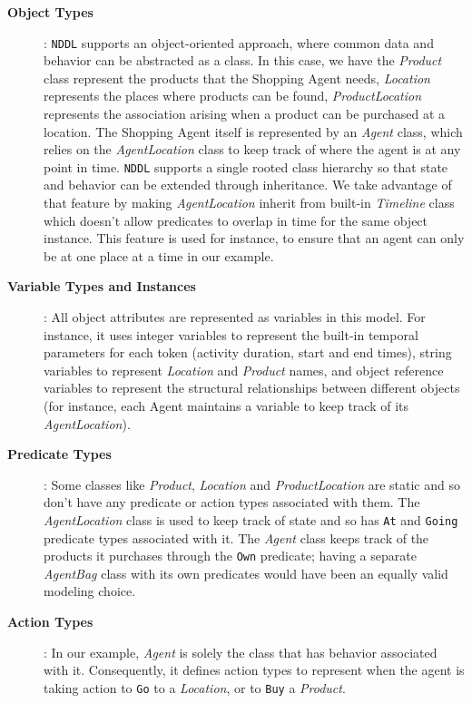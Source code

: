 \begin{description}

\item[\textbf{Object Types}]: \texttt{NDDL} supports an object-oriented
  approach, where common data and behavior can be abstracted as a
  class. In this case, we have the \textit{Product} class represent
  the products that the Shopping Agent needs, \textit{Location}
  represents the places where products can be found,
  \textit{ProductLocation} represents the association arising when a
  product can be purchased at a location. The Shopping Agent itself is
  represented by an \textit{Agent} class, which relies on the
  \textit{AgentLocation} class to keep track of where the agent is at
  any point in time. \texttt{NDDL} supports a single rooted class
  hierarchy so that state and behavior can be extended through
  inheritance. We take advantage of that feature by making
  \textit{AgentLocation} inherit from \eus built-in \textit{Timeline}
  class which doesn't allow predicates to overlap in time for the same
  object instance. This feature is used for instance, to ensure that
  an agent can only be at one place at a time in our example.

\item[\textbf{Variable Types and Instances}]: All object attributes
  are represented as variables in this model. For instance, it uses
  integer variables to represent the built-in temporal parameters for
  each token (activity duration, start and end times), string
  variables to represent \textit{Location} and \textit{Product} names,
  and object reference variables to represent the structural
  relationships between different objects (for instance, each Agent
  maintains a variable to keep track of its \textit{AgentLocation}).

\item[\textbf{Predicate Types}]: Some classes like \textit{Product},
  \textit{Location} and \textit{ProductLocation} are static and so
  don't have any predicate or action types associated with them. The
  \textit{AgentLocation} class is used to keep track of state and so
  has \texttt{At} and \texttt{Going} predicate types associated with
  it. The \textit{Agent} class keeps track of the products it
  purchases through the \texttt{Own} predicate; having a separate
  \textit{AgentBag} class with its own predicates would have been an
  equally valid modeling choice.

\item[\textbf{Action Types}]: In our example, \textit{Agent} is solely
  the class that has behavior associated with it. Consequently, it
  defines action types to represent when the agent is taking action to
  \texttt{Go} to a \textit{Location}, or to \texttt{Buy} a
  \textit{Product}. %

\end{description}


